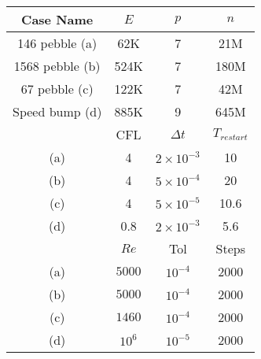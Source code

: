 \begin{table}\tiny
\begin{tabular}{||c| c c c ||}
  \hline
  Case Name & $E$ & $p$ & $n$\\
  \hline\hline
  146 pebble  (a) & 62K & 7 & 21M\\
  1568 pebble (b) & 524K & 7 & 180M\\
  67 pebble   (c) & 122K & 7 & 42M\\
  Speed bump  (d) & 885K & 9 & 645M\\
\hline
  & CFL & $\Delta t$ & $T_{restart}$\\
  \hline \rule{0pt}{2.5ex} 
  (a) & 4 & $2\times 10^{-3}$ & 10\\
  (b) & 4 & $5\times 10^{-4}$ & 20\\
  (c) & 4 & $5\times 10^{-5}$ & 10.6\\
  (d) & 0.8 & $2\times 10^{-3}$ & 5.6\\
  \hline
  & $Re$ & Tol & Steps \\
  \hline \rule{0pt}{2.5ex} 
  (a) & $5000$ & $10^{-4}$ & 2000\\
  (b) & $5000$ & $10^{-4}$ & 2000\\
  (c) & $1460$ & $10^{-4}$ & 2000\\
  (d) & $10^6$ & $10^{-5}$ & 2000\\
  \hline
\end{tabular}
\captionsetup{labelformat=empty}
\caption{
  \small
  \label{table:problem-sizes}
}
\end{table}
